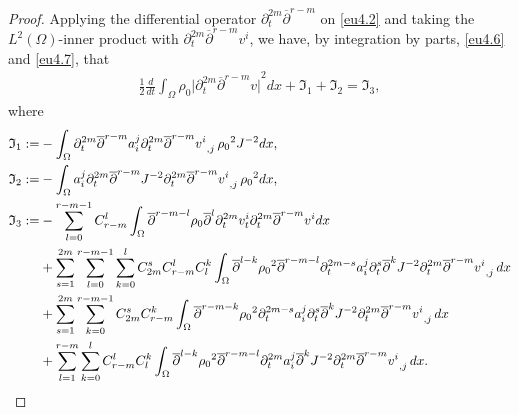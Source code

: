 \documentclass[12pt,twoside,reqno]{amsart}
\numberwithin{equation}{section}
\theoremstyle{definition}
\theoremstyle{remark}
\begin{document}
\begin{proof}
  Applying the differential operator ${\partial}_t^{2m}{\overline{\partial}}^{r-m}$ on \eqref{eu4.2} and taking the $L^2(\Omega)$-inner product with ${\partial}_t^{2m}{\overline{\partial}}^{r-m} v^i$, we have, by integration by parts, \eqref{eu4.6} and \eqref{eu4.7}, that
  \begin{align*}
  \frac{1}{2}\frac{d}{dt}\int_\Omega{\rho_0} {\vert{{\partial}_t^{2m}{\overline{\partial}}^{r-m} v}\vert}^2 dx+{\mathfrak{I}}_1+{\mathfrak{I}}_2  ={\mathfrak{I}}_3,
\end{align*}
where
\begin{align}
  {\mathfrak{I}}_1:=&-\int_\Omega {\partial}_t^{2m}{\overline{\partial}}^{r-m}a^j_i{{{{\partial}_t^{2m}{\overline{\partial}}^{r-m} v^i}}_{,{j}}\,} {\rho_0}^2 J^{-2}dx,{\nonumber}\\
  {\mathfrak{I}}_2:=&-\int_\Omega a^j_i {\partial}_t^{2m}{\overline{\partial}}^{r-m}J^{-2}{{{{\partial}_t^{2m}{\overline{\partial}}^{r-m} v^i}}_{,{j}}\,} {\rho_0}^2  dx,{\nonumber}\\
  {\mathfrak{I}}_3:=&-\sum_{l=0}^{r-m-1} C_{r-m}^l\int_\Omega{\overline{\partial}}^{r-m-l}{\rho_0} {\overline{\partial}}^l{\partial}_t^{2m} v_t^i{\partial}_t^{2m}{\overline{\partial}}^{r-m} v^i dx\label{eq.mix.1}\\
  &+\sum_{s=1}^{2m}\sum_{l=0}^{r-m-1}\sum_{k=0}^l C_{2m}^s C_{r-m}^l C_l^k \int_\Omega{\overline{\partial}}^{l-k}{\rho_0}^2  {\overline{\partial}}^{r-m-l}{\partial}_t^{2m-s}a^j_i {\partial}_t^s{\overline{\partial}}^kJ^{-2}{{{{\partial}_t^{2m}{\overline{\partial}}^{r-m} v^i}}_{,{j}}\,} dx\label{eq.mix.2}\\
  &+\sum_{s=1}^{2m}\sum_{k=0}^{r-m-1} C_{2m}^s  C_{r-m}^k \int_\Omega{\overline{\partial}}^{r-m-k}{\rho_0}^2  {\partial}_t^{2m-s}a^j_i {\partial}_t^s{\overline{\partial}}^kJ^{-2}{{{{\partial}_t^{2m}{\overline{\partial}}^{r-m} v^i}}_{,{j}}\,} dx\label{eq.mix.3}\\
  &+\sum_{l=1}^{r-m}\sum_{k=0}^l  C_{r-m}^l C_l^k \int_\Omega{\overline{\partial}}^{l-k}{\rho_0}^2  {\overline{\partial}}^{r-m-l}{\partial}_t^{2m}a^j_i {\overline{\partial}}^kJ^{-2}{{{{\partial}_t^{2m}{\overline{\partial}}^{r-m} v^i}}_{,{j}}\,} dx.\label{eq.mix.4}
\end{align}


\end{proof}
\end{document}
